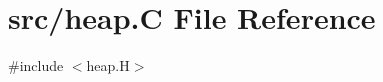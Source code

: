 \hypertarget{heap_8_c}{}\section{src/heap.C File Reference}
\label{heap_8_c}
{\ttfamily \#include $<$heap.\+H$>$}\newline
